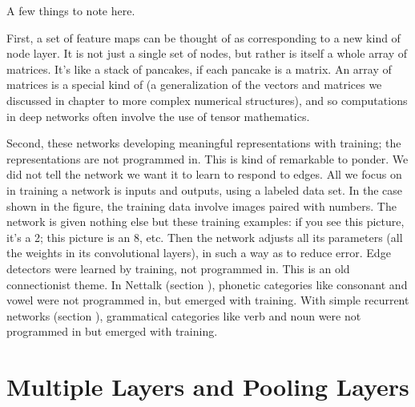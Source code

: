 
A few things to note here.

First, a set of feature maps can be thought of as corresponding to a new kind of node layer. It is not just a  single set of nodes, but rather is itself a whole array of matrices. It's like a stack of pancakes, if each pancake is a matrix.  An array of matrices is a special kind of  (a generalization of the vectors and matrices we discussed in chapter  to more complex numerical structures), and so computations in deep networks often involve the use of tensor mathematics.

Second, these networks developing meaningful representations with training; the representations are not programmed in. This is kind of remarkable to ponder. We did not tell the network we want it to learn to respond to edges. All we focus on in training a network is inputs and outputs, using a labeled data set.  In the case shown in the figure, the training data involve images paired with numbers. The network is given nothing else but these training examples: if you see this picture, it's a 2; this picture is an 8, etc. Then the network adjusts all its parameters (all the weights in its convolutional layers), in such a way as to reduce error.  Edge detectors were learned by training, not programmed in. This is an old connectionist theme. In Nettalk (section ), phonetic categories like consonant and vowel were not programmed in, but emerged with training. With simple recurrent networks  (section ), grammatical categories like verb and noun were not programmed in but  emerged with training.

\section{Multiple Layers and Pooling Layers}


